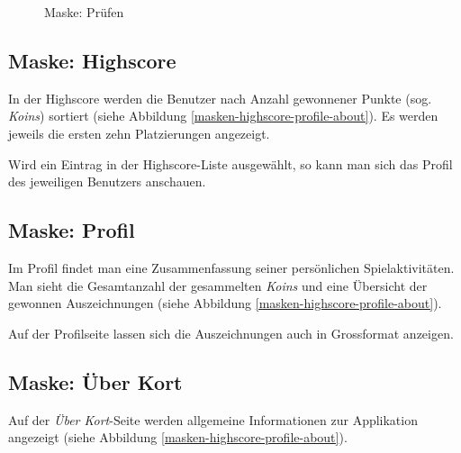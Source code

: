 \begin{figure}[H]
\hfill
{}
\caption{Maske: Prüfen}
\label{maske-pruefen}
\end{figure}

\subsection{Maske: Highscore}
In der Highscore werden die Benutzer nach Anzahl gewonnener Punkte (sog. \emph{Koins}) sortiert (siehe Abbildung \ref{masken-highscore-profile-about}).
Es werden jeweils die ersten zehn Platzierungen angezeigt.

Wird ein Eintrag in der Highscore-Liste ausgewählt, so kann man sich das Profil des jeweiligen Benutzers anschauen.

\subsection{Maske: Profil}
Im Profil findet man eine Zusammenfassung seiner persönlichen Spielaktivitäten.
Man sieht die Gesamtanzahl der gesammelten \emph{Koins} und eine Übersicht der gewonnen Auszeichnungen (siehe Abbildung \ref{masken-highscore-profile-about}).

Auf der Profilseite lassen sich die Auszeichnungen auch in Grossformat anzeigen.

\subsection{Maske: Über Kort}
Auf der \emph{Über Kort}-Seite werden allgemeine Informationen zur Applikation angezeigt (siehe Abbildung \ref{masken-highscore-profile-about}).

